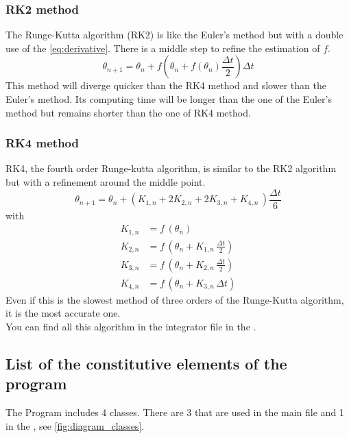 \documentclass[1pt, a4paper]{article}
\begin{document}
\subsubsection{RK2 method}
\label{subsubs:RK2}
The Runge-Kutta algorithm (RK2) is like the Euler's method but with a double use of the \autoref{eq:derivative}. There is a middle step to refine the estimation of $f$.
\begin{equation}
    \theta_{n+1} = \theta_n + f(\theta_n + f(\theta_n)\dfrac{\Delta t}{2})\Delta t
\end{equation}
This method will diverge quicker than the RK4 method and slower than the Euler's method. Its computing time will be longer than the one of the Euler's method but remains shorter than the one of RK4 method.
\subsubsection{RK4 method}
\label{subsubs:RK4}
RK4, the fourth order Runge-kutta algorithm, is similar to the RK2 algorithm but with a refinement around the middle point.
\begin{equation}
    \theta_{n+1} = \theta_n + (K_{1,n} + 2K_{2,n} + 2K_{3,n} + K_{4,n}\,)\frac{\Delta t}{6}
\end{equation}
with
\begin{equation}
    \begin{aligned}
        K_{1,n} &= f\,\left(\theta_n\right)\\
        K_{2,n} &= f\,\left(\theta_n + K_{1,n}\,\frac{\Delta t}{2}\right)\\
        K_{3,n} &= f\,\left(\theta_n + K_{2,n}\,\frac{\Delta t}{2}\right)\\
        K_{4,n} &= f\,\left(\theta_n + K_{3,n}\,\Delta t\right)
    \end{aligned}
\end{equation}
Even if this is the slowest method of three orders of the Runge-Kutta algorithm, it is the most accurate one.\\
You can find all this algorithm in the integrator file in the .
\subsection{List of the constitutive elements of the program}
\label{subs:2.3}
The Program includes 4 classes. There are 3 that are used in the main file and 1 in the , see \autoref{fig:diagram_classes}. 
\end{document}
